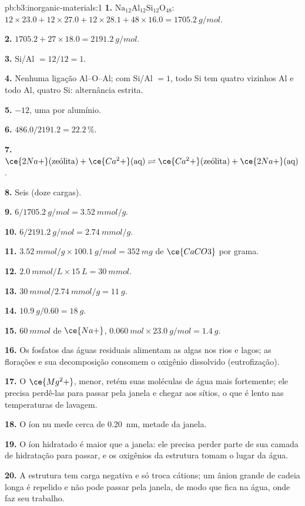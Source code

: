 \begin{solution}{pb:b3:inorganic-materials:1}
\textbf{1.} $\mathrm{Na_{12}Al_{12}Si_{12}O_{48}}$: $12 \times 23.0 + 12 \times 27.0 + 12 \times 28.1 + 48 \times 16.0 = \qty{1705.2}{g/mol}$.

\textbf{2.} $1705.2 + 27 \times 18.0 = \qty{2191.2}{g/mol}$.

\textbf{3.} Si/Al $= 12/12 = 1$.

\textbf{4.} Nenhuma ligação Al--O--Al; com Si/Al $= 1$, todo Si tem quatro vizinhos Al e todo
Al, quatro Si: alternância estrita.

\textbf{5.} $-12$, uma por alumínio.

\textbf{6.} $486.0/2191.2 = 22.2$\,\%.

\textbf{7.} $\ce{2Na+}(\text{zeólita}) + \ce{Ca^2+}(\text{aq}) \rightleftharpoons \ce{Ca^2+}(\text{zeólita}) + \ce{2Na+}(\text{aq})$.

\textbf{8.} Seis (doze cargas).

\textbf{9.} $6/\qty{1705.2}{g/mol} = \qty{3.52}{mmol/g}$.

\textbf{10.} $6/\qty{2191.2}{g/mol} = \qty{2.74}{mmol/g}$.

\textbf{11.} $\qty{3.52}{mmol/g} \times \qty{100.1}{g/mol} = \qty{352}{mg}$ de $\ce{CaCO3}$ por grama.

\textbf{12.} $\qty{2.0}{mmol/L} \times \qty{15}{L} = \qty{30}{mmol}$.

\textbf{13.} $\qty{30}{mmol}/\qty{2.74}{mmol/g} = \qty{11}{g}$.

\textbf{14.} $\qty{10.9}{g}/0.60 = \qty{18}{g}$.

\textbf{15.} $\qty{60}{mmol}$ de $\ce{Na+}$, $\qty{0.060}{mol} \times \qty{23.0}{g/mol} = \qty{1.4}{g}$.

\textbf{16.} Os fosfatos das águas residuais alimentam as algas nos rios e lagos; as florações
e sua decomposição consomem o oxigênio dissolvido (eutrofização).

\textbf{17.} O $\ce{Mg^2+}$, menor, retém suas moléculas de água mais fortemente; ele precisa perdê-las
para passar pela janela e chegar aos sítios, o que é lento nas temperaturas de lavagem.

\textbf{18.} O íon nu mede cerca de \qty{0.20}{nm}, metade da janela.

\textbf{19.} O íon hidratado é maior que a janela: ele precisa perder parte de sua
camada de hidratação para passar, e os oxigênios da estrutura tomam o lugar da
água.

\textbf{20.} A estrutura tem carga negativa e só troca cátions; um
ânion grande de cadeia longa é repelido e não pode passar pela janela, de modo que fica
na água, onde faz seu trabalho.


\end{solution}
